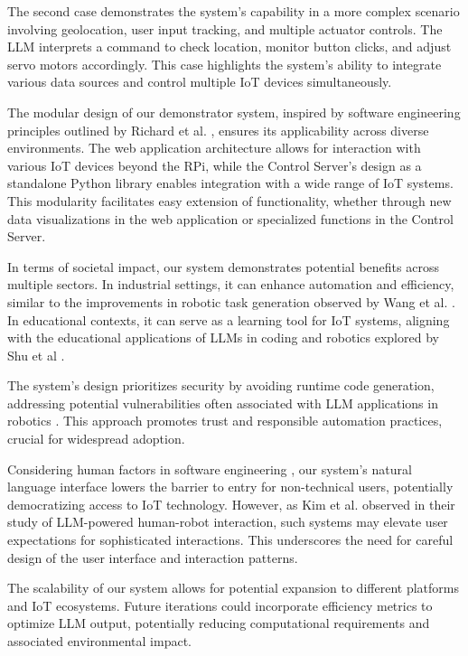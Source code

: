 \documentclass{ieeeaccess}
\begin{document}
The second case demonstrates the system's capability in a more complex scenario involving geolocation, user input tracking, and multiple actuator controls. The LLM interprets a command to check location, monitor button clicks, and adjust servo motors accordingly. This case highlights the system's ability to integrate various data sources and control multiple IoT devices simultaneously.

The modular design of our demonstrator system, inspired by software engineering principles outlined by Richard et al. \cite{taylor2010software}, ensures its applicability across diverse environments. The web application architecture allows for interaction with various IoT devices beyond the RPi, while the Control Server's design as a standalone Python library enables integration with a wide range of IoT systems. This modularity facilitates easy extension of functionality, whether through new data visualizations in the web application or specialized functions in the Control Server.

In terms of societal impact, our system demonstrates potential benefits across multiple sectors. In industrial settings, it can enhance automation and efficiency, similar to the improvements in robotic task generation observed by Wang et al. \cite{wang2024gensimgeneratingroboticsimulation}. In educational contexts, it can serve as a learning tool for IoT systems, aligning with the educational applications of LLMs in coding and robotics explored by Shu et al \cite{shu2024llmscodingroboticseducation}.

The system's design prioritizes security by avoiding runtime code generation, addressing potential vulnerabilities often associated with LLM applications in robotics \cite{wang2024gensimgeneratingroboticsimulation}. This approach promotes trust and responsible automation practices, crucial for widespread adoption.

Considering human factors in software engineering \cite{1553657}, our system's natural language interface lowers the barrier to entry for non-technical users, potentially democratizing access to IoT technology. However, as Kim et al. \cite{10.1145/3610977.3634966} observed in their study of LLM-powered human-robot interaction, such systems may elevate user expectations for sophisticated interactions. This underscores the need for careful design of the user interface and interaction patterns.

The scalability of our system allows for potential expansion to different platforms and IoT ecosystems. Future iterations could incorporate efficiency metrics to optimize LLM output, potentially reducing computational requirements and associated environmental impact.
\end{document}
